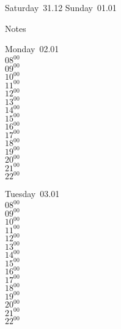 \documentclass[11pt,a4paper]{book}\usepackage[]{graphicx}\usepackage[]{color}
\begin{document}
\begin{weekendbox}
  Saturday~31.12
  \tcblower
  Sunday~01.01
\end{weekendbox} %
\begin{notebox}
  Notes
\end{notebox}
\clearpage
\begin{headerbox}
\end{headerbox}
\begin{weekdaybox}
  Monday~02.01\\
  { 
  \vfill
  $08^{00}$\\
$09^{00}$\\
$10^{00}$\\
$11^{00}$\\
$12^{00}$\\
$13^{00}$\\
$14^{00}$\\
$15^{00}$\\
$16^{00}$\\
$17^{00}$\\
$18^{00}$\\
$19^{00}$\\
$20^{00}$\\
$21^{00}$\\
$22^{00}$\\
  }
\end{weekdaybox}
\begin{weekdaybox}
  Tuesday~03.01\\
  { 
  \vfill
  $08^{00}$\\
$09^{00}$\\
$10^{00}$\\
$11^{00}$\\
$12^{00}$\\
$13^{00}$\\
$14^{00}$\\
$15^{00}$\\
$16^{00}$\\
$17^{00}$\\
$18^{00}$\\
$19^{00}$\\
$20^{00}$\\
$21^{00}$\\
$22^{00}$\\
  }
\end{weekdaybox}
\end{document}
